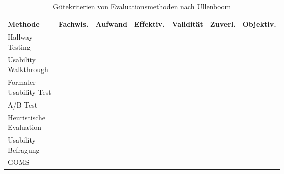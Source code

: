 \begin{table}[H]
		\begin{tabular}{|l|c|c|c|c|c|c|}
			\hline
			\textbf{Methode}&\textbf{Fachwis.}&\textbf{Aufwand}&\textbf{Effektiv.}&\textbf{Validität}&\textbf{Zuverl.}&\textbf{Objektiv.}\\
			\hline
			\twolinecell{Hallway\\Testing} & \star & \star & \star \star & \star & \star & \star\\
			\hline
			\twolinecell{Usability\\Walkthrough} & \star \star & \star \star & \star \star & \star \star & \star & \star\\
			\hline
			\twolinecell{Formaler\\Usability-Test} & \star \star & \star \star \star & \star \star \star & \star \star \star & \star \star & \star \star\\
			\hline								
			\twolinecell{A/B-Test\\[2.3ex]} & \star \star & \star \star & \star \star & \star \star \star & \star \star & \star \star \star\\
			\hline
			\twolinecell{Heuristische\\Evaluation} & \star \star \star & \star & \star \star \star & \star \star & \star \star \star & \star\\
			\hline
			\twolinecell{Usability-\\Befragung} & \star & \star & \star & \star \star & \star \star & \star \star \star\\
			\hline
			\twolinecell{GOMS\\[2.3ex]} & \star \star & \star \star & \star & \star \star & \star \star \star & \star \star \star\\
			\hline
		\end{tabular}
		\caption{Gütekriterien von Evaluationsmethoden nach Ullenboom \cite[S. 225]{Ullenboom2014}}
	\label{tab:hallwayTesting}
\end{table}
